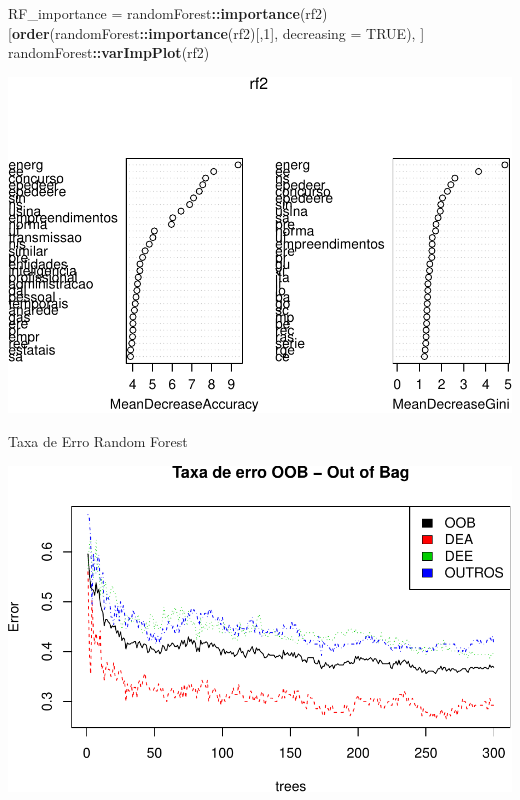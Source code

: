 \documentclass[]{article}
\newenvironment{Shaded}{\begin{snugshade}}{\end{snugshade}}
\newcommand{\KeywordTok}[1]{\textcolor[rgb]{0.13,0.29,0.53}{\textbf{#1}}}
\newcommand{\DataTypeTok}[1]{\textcolor[rgb]{0.13,0.29,0.53}{#1}}
\newcommand{\DecValTok}[1]{\textcolor[rgb]{0.00,0.00,0.81}{#1}}
\newcommand{\StringTok}[1]{\textcolor[rgb]{0.31,0.60,0.02}{#1}}
\newcommand{\OtherTok}[1]{\textcolor[rgb]{0.56,0.35,0.01}{#1}}
\newcommand{\OperatorTok}[1]{\textcolor[rgb]{0.81,0.36,0.00}{\textbf{#1}}}
\newcommand{\NormalTok}[1]{#1}
\begin{document}
\begin{Shaded}
\begin{Highlighting}[]
\NormalTok{RF_importance =}\StringTok{ }\NormalTok{randomForest}\OperatorTok{::}\KeywordTok{importance}\NormalTok{(rf2)[}\KeywordTok{order}\NormalTok{(randomForest}\OperatorTok{::}\KeywordTok{importance}\NormalTok{(rf2)[,}\DecValTok{1}\NormalTok{], }\DataTypeTok{decreasing =} \OtherTok{TRUE}\NormalTok{), ]}
\NormalTok{randomForest}\OperatorTok{::}\KeywordTok{varImpPlot}\NormalTok{(rf2)}
\end{Highlighting}
\end{Shaded}

\includegraphics{markdown_v42_files/figure-latex/unnamed-chunk-90-1.pdf}

Taxa de Erro Random Forest

\begin{Shaded}
\end{Shaded}

\includegraphics{markdown_v42_files/figure-latex/unnamed-chunk-91-1.pdf}
\end{document}
